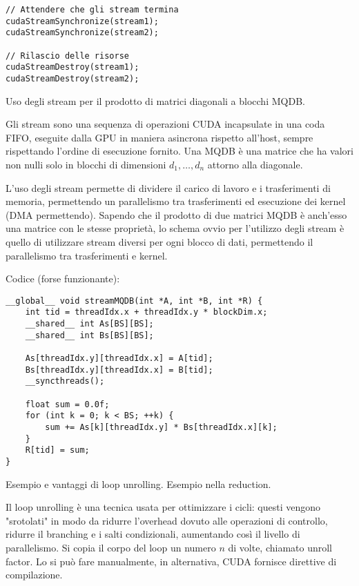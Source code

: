 \begin{questions}
\begin{solution}
\begin{verbatim}
// Attendere che gli stream termina
cudaStreamSynchronize(stream1);
cudaStreamSynchronize(stream2);

// Rilascio delle risorse
cudaStreamDestroy(stream1);
cudaStreamDestroy(stream2);
        \end{verbatim}
    \end{solution}
    
    \question Uso degli stream per il prodotto di matrici diagonali a blocchi MQDB.
    
    \begin{solution}
        Gli stream sono una sequenza di operazioni CUDA incapsulate in una coda FIFO, eseguite dalla GPU in maniera asincrona rispetto all'host, sempre rispettando l'ordine di esecuzione fornito. Una MQDB è una matrice che ha valori non nulli solo in blocchi di dimensioni $d_1, \dots, d_n$ attorno alla diagonale.
        
        L'uso degli stream permette di dividere il carico di lavoro e i trasferimenti di memoria, permettendo un parallelismo tra trasferimenti ed esecuzione dei kernel (DMA permettendo). Sapendo che il prodotto di due matrici MQDB è anch'esso una matrice con le stesse proprietà, lo schema ovvio per l'utilizzo degli stream è quello di utilizzare stream diversi per ogni blocco di dati, permettendo il parallelismo tra trasferimenti e kernel.
        
        Codice (forse funzionante):
        \begin{verbatim}
__global__ void streamMQDB(int *A, int *B, int *R) {
    int tid = threadIdx.x + threadIdx.y * blockDim.x;
    __shared__ int As[BS][BS];
    __shared__ int Bs[BS][BS];

    As[threadIdx.y][threadIdx.x] = A[tid];
    Bs[threadIdx.y][threadIdx.x] = B[tid];
    __syncthreads();

    float sum = 0.0f;
    for (int k = 0; k < BS; ++k) {
        sum += As[k][threadIdx.y] * Bs[threadIdx.x][k];
    }
    R[tid] = sum;
}
        \end{verbatim}
    \end{solution}
    
    \question Esempio e vantaggi di loop unrolling. Esempio nella reduction.
    
    \begin{solution}
        Il loop unrolling è una tecnica usata per ottimizzare i cicli: questi vengono "srotolati" in modo da ridurre l'overhead dovuto alle operazioni di controllo, ridurre il branching e i salti condizionali, aumentando così il livello di parallelismo. Si copia il corpo del loop un numero $n$ di volte, chiamato unroll factor. Lo si può fare manualmente, in alternativa, CUDA fornisce direttive di compilazione.
        

\end{solution}
\end{questions}
